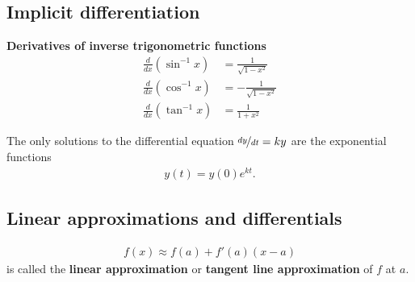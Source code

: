 \documentclass{article}
\begin{document}
\subsection{Implicit differentiation}
\begin{theorem}
    \textbf{Derivatives of inverse trigonometric functions}\\
    \begin{align*}
        \frac{d}{dx}(\sin^{-1}x)&=\frac{1}{\sqrt{1-x^2}}\\
        \frac{d}{dx}(\cos^{-1}x)&=-\frac{1}{\sqrt{1-x^2}}\\
        \frac{d}{dx}(\tan^{-1}x)&=\frac{1}{1+x^2}
    \end{align*}
\end{theorem}
\begin{theorem}
    The only solutions to the differential equation $\nicefrac{dy}{dt}=ky$ are the exponential functions
    \begin{align*}
        y(t)=y(0)e^{kt}.
    \end{align*}
\end{theorem}
\setcounter{subsection}{9}
\subsection{Linear approximations and differentials}
\begin{theorem}
    \begin{align*}
        f(x)\approx f(a)+f'(a)(x-a)
    \end{align*}
    is called the \textbf{linear approximation} or \textbf{tangent line approximation} of $f$ at $a$.
\end{theorem}
\end{document}
